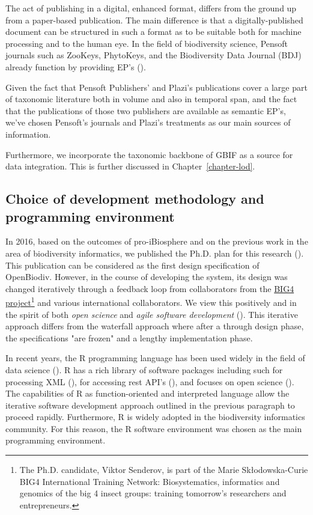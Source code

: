 The act of publishing in a digital, enhanced format, differs from the ground up from a paper-based publication. The main difference is that a digitally-published document can be structured in such a format as to be suitable both for machine processing and to the human eye. In the field of biodiversity science, Pensoft journals such as ZooKeys, PhytoKeys, and the Biodiversity Data Journal (BDJ) already function by providing EP's (\cite{penev_semantic_2010}).

Given the fact that Pensoft Publishers' and Plazi's publications cover a large part of taxonomic literature both in volume and also in temporal span, and the fact that the publications of those two publishers are available as semantic EP's, we've chosen Pensoft's journals and Plazi's treatments as our main sources of information.

Furthermore, we incorporate the taxonomic backbone of GBIF \cite{gbif_secretariat_gbif_2017} as a source for data integration. This is further discussed in Chapter~\ref{chapter-lod}.

\subsection*{Choice of development methodology and programming environment}

In 2016, based on the outcomes of pro-iBiosphere and on the previous work in the area of biodiversity informatics, we published the Ph.D. plan for this research (\cite{senderov_open_2016}). This publication can be considered as the first design specification of OpenBiodiv. However, in the course of developing the system, its design was changed iteratively through a feedback loop from collaborators from the \href{http://big4-project.eu}{BIG4 project}\footnote{The Ph.D. candidate, Viktor Senderov, is part of the Marie Skłodowska-Curie BIG4 International Training Network: Biosystematics, informatics and genomics of the big 4 insect groups: training tomorrow's researchers and entrepreneurs.} and various international collaborators. We view this positively and in the spirit of both \emph{open science} and \emph{agile software development} (\cite{beck_manifesto_2001}). This iterative approach differs from the waterfall approach where after a through design phase, the specifications "are frozen" and a lengthy implementation phase.

In recent years, the R programming language has been used widely in the field of data science (\cite{r_core_team_r:_2016}). R has a rich library of software packages including such for processing XML (\cite{wickham_xml2:_2018}), for accessing rest API's (\cite{wickham_httr:_2017}), and focuses on open science (\cite{boettiger_building_2015}). The capabilities of R as function-oriented and interpreted language allow the iterative software development approach outlined in the previous paragraph to proceed rapidly. Furthermore, R is widely adopted in the biodiversity informatics community. For this reason, the R software environment was chosen as the main programming environment.

